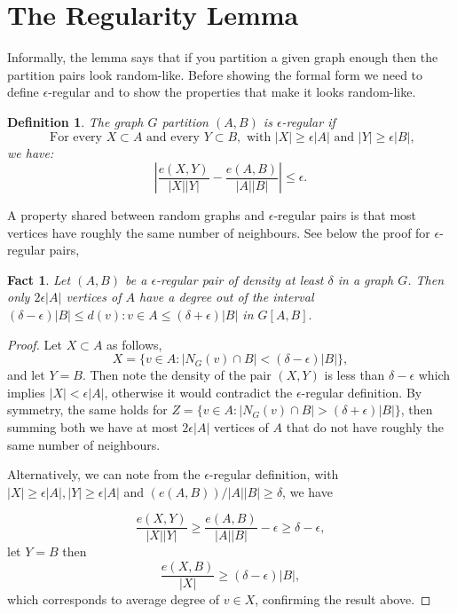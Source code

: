 \documentclass[12pt,twoside,a4paper]{book}
\numberwithin{equation}{section}
\newtheorem{definition}	[theorem] {Definition}
\newtheorem{fact}	[theorem] {Fact}
\theoremstyle{remark}
\begin{document}
\section{The Regularity Lemma}

Informally, the lemma says that if you partition a given graph enough then the partition pairs look random-like. Before showing the formal form we need to define $\epsilon$-regular and to show the properties that make it looks random-like.

\begin{definition}
The graph $G$ partition $(A,B)$ is $\epsilon$-regular if
$$\text{ For every } X \subset A \text{ and every } Y \subset B,\text{ with } |X| \geq \epsilon|A| \text{ and } |Y| \geq \epsilon |B|,$$
we have:
$$ \left| \frac{e(X,Y)}{|X||Y|} - \frac{e(A,B)}{|A||B|} \right| \leq \epsilon  .$$
\end{definition}


A property shared between random graphs and $\epsilon$-regular pairs is that most vertices have roughly the same number of neighbours. See below the proof for $\epsilon$-regular pairs,

\begin{fact}\label{fact:503}
Let $(A,B)$ be a $\epsilon$-regular pair of density at least $\delta$ in a graph $G$. Then only $2 \epsilon |A| $ vertices of $A$ have a degree out of the interval $(\delta - \epsilon)|B| \leq d(v): v \in A \leq (\delta + \epsilon)|B|$ in $G[A,B].$
\end{fact}
\begin{proof}
Let $X \subset A$ as follows,
$$ X = \{v \in A \colon | N_G(v) \cap B | < (\delta-\epsilon)|B|\}, $$ 
and let $Y=B$. Then note the density of the pair $(X,Y)$ is less than  $\delta - \epsilon$ which implies $|X| < \epsilon |A|$, otherwise it would contradict the  $\epsilon$-regular definition. By symmetry, the same holds for $Z = \{ v \in A \colon |N_G(v) \cap B| > (\delta+\epsilon)|B|\}$, then summing both we have at most $2 \epsilon |A| $ vertices of $A$ that do not have roughly the same number of neighbours.

Alternatively, we can note from the $\epsilon$-regular definition, with $|X| \geq \epsilon|A|, |Y|\geq \epsilon|A|$ and $ (e(A,B))/|A||B| \geq \delta $, we have

$$ \frac{e(X,Y)}{|X||Y|} \geq \frac{e(A,B)}{|A||B|} - \epsilon \geq \delta - \epsilon,$$
let $Y = B$ then
$$ \frac{e(X,B)}{|X|} \geq (\delta - \epsilon)|B|,$$
which corresponds to average degree of $v \in X$, confirming the result above.
\end{proof}
\end{document}
